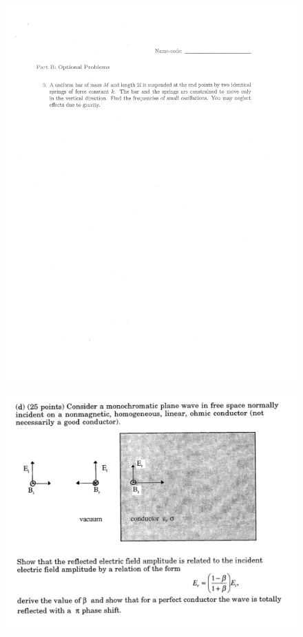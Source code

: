 \documentclass[10pt,a4paper]{article}
\begin{document}
\begin{figure}[H]
 \centering
 \includegraphics[width=16cm]{pdf/1-1T49.png}
\end{figure}
 \newpage
\begin{figure}[H]
 \centering
 \includegraphics[width=16cm]{pdf/1-1T4.png}
\end{figure}
\end{document}
